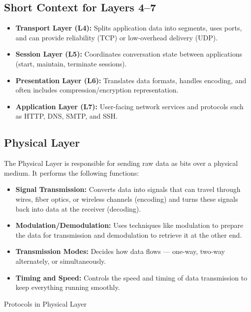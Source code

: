\documentclass[12pt,a4paper]{article}
\begin{document}
\subsection*{Short Context for Layers 4--7}
\begin{itemize}
    \item \textbf{Transport Layer (L4):} Splits application data into segments, uses ports, and can provide reliability (TCP) or low-overhead delivery (UDP).
    \item \textbf{Session Layer (L5):} Coordinates conversation state between applications (start, maintain, terminate sessions).
    \item \textbf{Presentation Layer (L6):} Translates data formats, handles encoding, and often includes compression/encryption representation.
    \item \textbf{Application Layer (L7):} User-facing network services and protocols such as HTTP, DNS, SMTP, and SSH.
\end{itemize}

\subsection{Physical Layer}
The Physical Layer is responsible for sending raw data as bits over a physical medium. It performs the following functions:

\begin{itemize}
    \item \textbf{Signal Transmission:} Converts data into signals that can travel through wires, fiber optics, or wireless channels (encoding) and turns these signals back into data at the receiver (decoding).
    \item \textbf{Modulation/Demodulation:} Uses techniques like modulation to prepare the data for transmission and demodulation to retrieve it at the other end.
    \item \textbf{Transmission Modes:} Decides how data flows --- one-way, two-way alternately, or simultaneously.
    \item \textbf{Timing and Speed:} Controls the speed and timing of data transmission to keep everything running smoothly.
\end{itemize}

Protocols in Physical Layer
\end{document}
